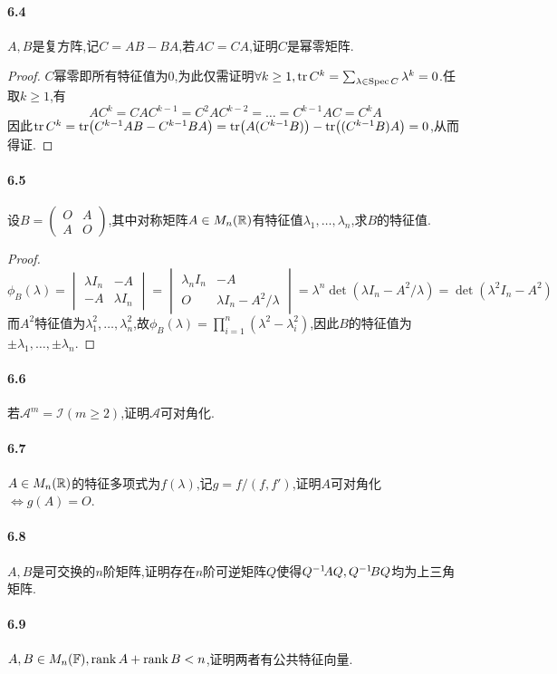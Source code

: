 \documentclass[11pt]{article}
\begin{document}
\paragraph{6.4}$A,B$是复方阵,记$C=AB-BA$,若$AC=CA$,证明$C$是幂零矩阵.
\begin{proof}
    $C$幂零即所有特征值为0,为此仅需证明$\forall k\geq 1, \operatorname{tr} C^k=\sum_{\lambda\in \operatorname{Spec} C}\lambda^k=0$.任取$k\geq 1$,有
    $$AC^k=CAC^{k-1}=C^2AC^{k-2}=\dots=C^{k-1}AC=C^kA$$
    因此$\operatorname{tr} C^k=\operatorname{tr}\!\left(C^{k-1}AB-C^{k-1}BA\right)=\operatorname{tr}\!\left(A(C^{k-1}B)\right)-\operatorname{tr}\!\left((C^{k-1}B)A\right)=0$,从而得证.
\end{proof}
\paragraph{6.5}设$B=\begin{pmatrix}
    O&A\\ A&O
\end{pmatrix}$,其中对称矩阵$A\in M_n(\mathbb{R})$有特征值$\lambda_1,\dots,\lambda_n$,求$B$的特征值.
\begin{proof}
    $$\phi_B(\lambda)=\begin{vmatrix}
        \lambda I_n & -A \\
        -A & \lambda I_n
    \end{vmatrix}=\begin{vmatrix}
        \lambda_n I_n & -A\\
        O & \lambda I_n - A^2/\lambda
    \end{vmatrix}=\lambda^n \det(\lambda I_n-A^2/\lambda)=\det(\lambda^2 I_n-A^2)$$
    而$A^2$特征值为$\lambda_1^2,\dots,\lambda_n^2$,故$\phi_B(\lambda)=\prod_{i=1}^{n}(\lambda^2-\lambda_i^2)$,因此$B$的特征值为$\pm \lambda_1,\dots,\pm \lambda_n$.
\end{proof}
\paragraph{6.6}若$\mathscr{A}^m=\mathscr{I} (m\geq 2)$,证明$\mathscr{A}$可对角化.
\paragraph{6.7}$A\in M_n(\mathbb{R})$的特征多项式为$f(\lambda)$,记$g=f/(f,f')$,证明$A$可对角化$\iff g(A)=O$.
\paragraph{6.8}$A,B$是可交换的$n$阶矩阵,证明存在$n$阶可逆矩阵$Q$使得$Q^{-1}\! AQ, Q^{-1}\! BQ$均为上三角矩阵.
\paragraph{6.9}$A,B\in M_n(\mathbb{F}), \operatorname{rank} A+\operatorname{rank} B<n$,证明两者有公共特征向量.
\end{document}
